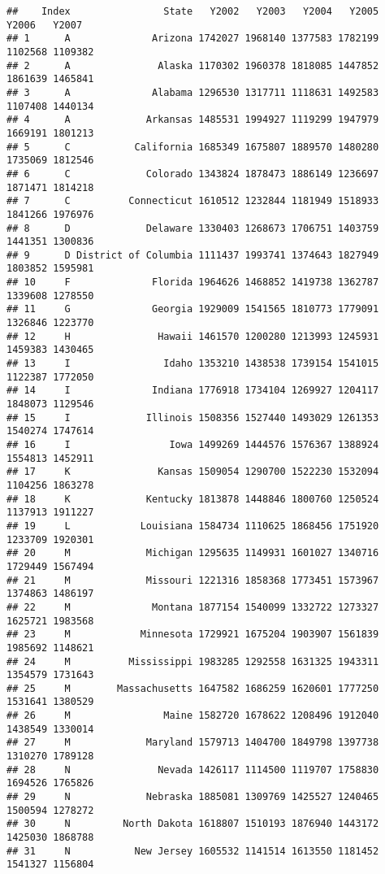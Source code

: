 \documentclass[
]{article}
\begin{document}
\begin{verbatim}
##    Index                State   Y2002   Y2003   Y2004   Y2005   Y2006   Y2007
## 1      A              Arizona 1742027 1968140 1377583 1782199 1102568 1109382
## 2      A               Alaska 1170302 1960378 1818085 1447852 1861639 1465841
## 3      A              Alabama 1296530 1317711 1118631 1492583 1107408 1440134
## 4      A             Arkansas 1485531 1994927 1119299 1947979 1669191 1801213
## 5      C           California 1685349 1675807 1889570 1480280 1735069 1812546
## 6      C             Colorado 1343824 1878473 1886149 1236697 1871471 1814218
## 7      C          Connecticut 1610512 1232844 1181949 1518933 1841266 1976976
## 8      D             Delaware 1330403 1268673 1706751 1403759 1441351 1300836
## 9      D District of Columbia 1111437 1993741 1374643 1827949 1803852 1595981
## 10     F              Florida 1964626 1468852 1419738 1362787 1339608 1278550
## 11     G              Georgia 1929009 1541565 1810773 1779091 1326846 1223770
## 12     H               Hawaii 1461570 1200280 1213993 1245931 1459383 1430465
## 13     I                Idaho 1353210 1438538 1739154 1541015 1122387 1772050
## 14     I              Indiana 1776918 1734104 1269927 1204117 1848073 1129546
## 15     I             Illinois 1508356 1527440 1493029 1261353 1540274 1747614
## 16     I                 Iowa 1499269 1444576 1576367 1388924 1554813 1452911
## 17     K               Kansas 1509054 1290700 1522230 1532094 1104256 1863278
## 18     K             Kentucky 1813878 1448846 1800760 1250524 1137913 1911227
## 19     L            Louisiana 1584734 1110625 1868456 1751920 1233709 1920301
## 20     M             Michigan 1295635 1149931 1601027 1340716 1729449 1567494
## 21     M             Missouri 1221316 1858368 1773451 1573967 1374863 1486197
## 22     M              Montana 1877154 1540099 1332722 1273327 1625721 1983568
## 23     M            Minnesota 1729921 1675204 1903907 1561839 1985692 1148621
## 24     M          Mississippi 1983285 1292558 1631325 1943311 1354579 1731643
## 25     M        Massachusetts 1647582 1686259 1620601 1777250 1531641 1380529
## 26     M                Maine 1582720 1678622 1208496 1912040 1438549 1330014
## 27     M             Maryland 1579713 1404700 1849798 1397738 1310270 1789128
## 28     N               Nevada 1426117 1114500 1119707 1758830 1694526 1765826
## 29     N             Nebraska 1885081 1309769 1425527 1240465 1500594 1278272
## 30     N         North Dakota 1618807 1510193 1876940 1443172 1425030 1868788
## 31     N           New Jersey 1605532 1141514 1613550 1181452 1541327 1156804

\end{verbatim}
\end{document}
